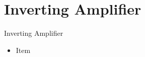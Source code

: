 \section{Inverting Amplifier}
\begin{frame}{Inverting Amplifier}
	\begin{itemize}
		\item Item
	\end{itemize}
\end{frame}